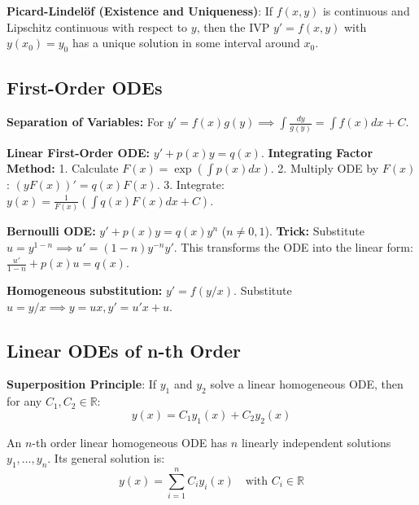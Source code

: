 \begin{theorem}
    \textbf{Picard-Lindelöf (Existence and Uniqueness)}: If $f(x, y)$ is continuous and Lipschitz continuous with respect to $y$, then the IVP $y' = f(x, y)$ with $y(x_0) = y_0$ has a unique solution in some interval around $x_0$.
\end{theorem}

\subsection{First-Order ODEs}

\begin{theorem}
    \textbf{Separation of Variables:} For $y' = f(x)g(y) \implies \int \frac{dy}{g(y)} = \int f(x)dx + C$.
\end{theorem}

\begin{theorem}
    \textbf{Linear First-Order ODE:} $y' + p(x)y = q(x)$.
    \textbf{Integrating Factor Method:} 
    1. Calculate $F(x) = \exp\left(\int p(x)dx\right)$.
    2. Multiply ODE by $F(x)$: $(y F(x))' = q(x)F(x)$.
    3. Integrate: $y(x) = \frac{1}{F(x)} \left(\int q(x)F(x)dx + C\right)$.
\end{theorem}

\begin{theorem}
    \textbf{Bernoulli ODE:} $y' + p(x)y = q(x)y^n$ ($n \neq 0, 1$).
    \textbf{Trick:} Substitute $u = y^{1-n} \implies u' = (1-n)y^{-n}y'$.
    This transforms the ODE into the linear form: $\frac{u'}{1-n} + p(x)u = q(x)$.
\end{theorem}

\begin{theorem}
    \textbf{Homogeneous substitution:} $y' = f(y/x)$. Substitute $u = y/x \implies y = ux, y' = u'x + u$.
\end{theorem}

\subsection{Linear ODEs of n-th Order}

\begin{theorem}
    \textbf{Superposition Principle}: If $y_1$ and $y_2$ solve a linear homogeneous ODE, then for any $C_1, C_2 \in \mathbb{R}$:
    $$y(x) = C_1 y_1(x) + C_2 y_2(x)$$
\end{theorem}

\begin{theorem}
    An $n$-th order linear homogeneous ODE has $n$ linearly independent solutions $y_1, \dots, y_n$. Its general solution is:
    $$y(x) = \sum_{i=1}^n C_i y_i(x) \quad \text{with } C_i \in \mathbb{R}$$
\end{theorem}

